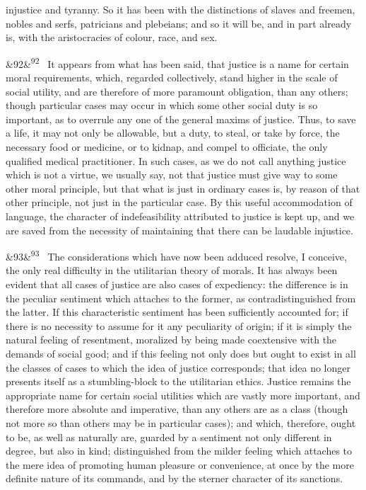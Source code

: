 \documentclass[12pt]{article}
\newcommand{\para}[1][]{\par\noindent\ifx&#1&\else\textsuperscript{\footnotesize #1}~\fi}
\begin{document}
injustice and tyranny. So it has been with the distinctions of slaves and freemen, nobles and serfs, patricians and plebeians; and so it will be, and in part already is, with the aristocracies of colour, race, and sex.

\para[92] It appears from what has been said, that justice is a name for certain moral requirements, which, regarded collectively, stand higher in the scale of social utility, and are therefore of more paramount obligation, than any others; though particular cases may occur in which some other social duty is so important, as to overrule any one of the general maxims of justice. Thus, to save a life, it may not only be allowable, but a duty, to steal, or take by force, the necessary food or medicine, or to kidnap, and compel to officiate, the only qualified medical practitioner. In such cases, as we do not call anything justice which is not a virtue, we usually say, not that justice must give way to some other moral principle, but that what is just in ordinary cases is, by reason of that other principle, not just in the particular case. By this useful accommodation of language, the character of indefeasibility attributed to justice is kept up, and we are saved from the necessity of maintaining that there can be laudable injustice.

\para[93] The considerations which have now been adduced resolve, I conceive, the only real difficulty in the utilitarian theory of morals. It has always been evident that all cases of justice are also cases of expediency: the difference is in the peculiar sentiment which attaches to the former, as contradistinguished from the latter. If this characteristic sentiment has been sufficiently accounted for; if there is no necessity to assume for it any peculiarity of origin; if it is simply the natural feeling of resentment, moralized by being made coextensive with the demands of social good; and if this feeling not only does but ought to exist in all the classes of cases to which the idea of justice corresponds; that idea no longer presents itself as a stumbling-block to the utilitarian ethics. Justice remains the appropriate name for certain social utilities which are vastly more important, and therefore more absolute and imperative, than any others are as a class (though not more so than others may be in particular cases); and which, therefore, ought to be, as well as naturally are, guarded by a sentiment not only different in degree, but also in kind; distinguished from the milder feeling which attaches to the mere idea of promoting human pleasure or convenience, at once by the more definite nature of its commands, and by the sterner character of its sanctions.

\end{document}
